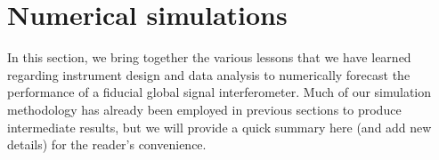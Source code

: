 \documentclass[twocolumn,apj,numberedappendix]{emulateapj}
\newcommand{\R}{\mathbf{R}}
\newcommand{\rhat}{\hat{\mathbf{r}}}
\newcommand{\Nbl}{N_{\textrm{bl}}}
\newcommand{\acl}[1]{}
\newcommand{\mep}[1]{}
\begin{document}
%
%
%
%

\section{Numerical simulations}
\label{sec:SimResults}

In this section, we bring together the various lessons that we have learned regarding instrument design and data analysis to numerically forecast the performance of a fiducial global signal interferometer. Much of our simulation methodology has already been employed in previous sections to produce intermediate results, but we will provide a quick summary here (and add new details) for the reader's convenience.
\end{document}
